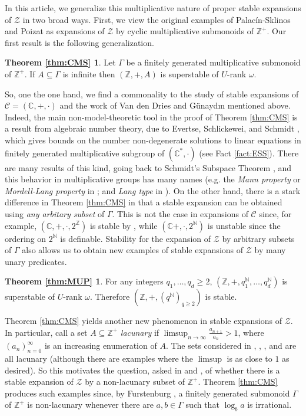 \documentclass{amsart}
\def\seq{\subseteq}
\newcommand{\cC}{\mathcal{C}}
\newcommand{\cZ}{\mathcal{Z}}
\def\C{\mathbb C}
\def\N{\mathbb N}
\def\Z{\mathbb Z}
\theoremstyle{definition}
\begin{document}
In this article, we generalize this multiplicative nature of proper stable expansions of $\cZ$ in two broad ways. First, we view the original examples of Palac\'{i}n-Sklinos and Poizat as expansions of $\cZ$ by cyclic multiplicative submonoids of $\Z^+$. Our first result is the following generalization.


\newtheorem*{thm:CMS}{Theorem \ref{thm:CMS}}
\begin{thm:CMS}
Let $\Gamma$ be a finitely generated multiplicative submonoid of $\Z^+$. If $A\seq \Gamma$ is infinite then $(\Z,+,A)$ is superstable of $U$-rank $\omega$.
\end{thm:CMS}


So, one the one hand, we find a commonality to the study of stable expansions of $\cC=(\C,+,\cdot)$ and the work of Van den Dries and G\"{u}nayd{\i}n \cite{vdDGu} mentioned above. Indeed, the main non-model-theoretic tool in the proof of Theorem \ref{thm:CMS} is a result from algebraic number theory, due to Evertse, Schlickewei, and Schmidt \cite{ESS}, which gives bounds on the number non-degenerate solutions to linear equations in finitely generated multiplicative subgroup of $(\C^*,\cdot)$ (see Fact \ref{fact:ESS}). There are many results of this kind, going back to Schmidt's Subspace Theorem \cite{SchST}, and this behavior in multiplicative groups has many names (e.g. the \emph{Mann property} or  \emph{Mordell-Lang property} in \cite{vdDGu}; and \emph{Lang type} in \cite{PiLC}). On the other hand, there is a stark difference in Theorem \ref{thm:CMS} in that a stable expansion can be obtained using \emph{any arbitary subset} of $\Gamma$. This is not the case in expansions of $\cC$ since, for example, $(\C,+,\cdot,2^{\Z})$ is stable by \cite{vdDGu}, while $(\C+,\cdot,2^{\N})$ is unstable since the ordering on $2^{\N}$ is definable. Stability for the expansion of $\cZ$ by arbitrary subsets of $\Gamma$ also allows us to obtain new examples of stable expansions of $\cZ$ by many unary predicates.

\newtheorem*{thm:MUP}{Theorem \ref{thm:MUP}}
\begin{thm:MUP}
For any integers $q_1,\ldots,q_d\geq 2$, $(\Z,+,q_1^{\N},\ldots,q_d^{\N})$ is superstable of $U$-rank $\omega$. Therefore $(\Z,+,(q^{\N})_{q\geq 2})$ is stable.
\end{thm:MUP}

Theorem \ref{thm:CMS} yields another new phenomenon in stable expansions of $\cZ$. In particular, call a set $A\seq\Z^+$ \emph{lacunary} if $\limsup_{n\to\infty}\frac{a_{n+1}}{a_n}>1$, where $(a_n)_{n=0}^\infty$ is an increasing enumeration of $A$. The sets considered in \cite{CoSS}, \cite{PoLa}, \cite{PaSk}, and \cite{PoZ} are all lacunary (although there are examples where the $\limsup$ is as close to $1$ as desired). So this motivates the question, asked in \cite{CoSS} and \cite{PoLa}, of whether there is a stable expansion of $\cZ$ by a non-lacunary subset of $\Z^+$. Theorem \ref{thm:CMS} produces such examples since, by Furstenburg \cite{FurstLac}, a finitely generated submonoid $\Gamma$ of $\Z^+$ is non-lacunary whenever there are $a,b\in\Gamma$ such that $\log_b a$ is irrational. 
\end{document}
